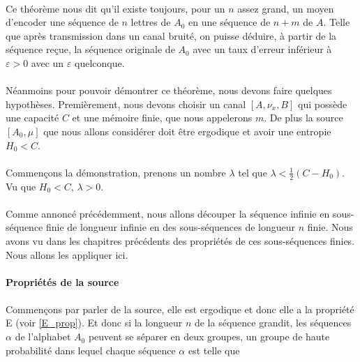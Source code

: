 	\paragraph{}
	Ce théorème nous dit qu'il existe toujours, pour un $n$ assez grand, un moyen d'encoder une séquence de $n$ lettres
	de $A_0$ en une séquence de $n+m$ de $A$. Telle que après transmission dans un canal bruité, on puisse déduire, 
	à partir de la séquence reçue, la séquence originale de $A_0$ avec un taux d'erreur inférieur à $\varepsilon >0$ avec un $\varepsilon$
	quelconque.
	
	\paragraph{}
	Néanmoins pour pouvoir démontrer ce théorème, nous devons faire quelques hypothèses. Premièrement, nous devons choisir un
	canal $[A,\nu_x,B]$ qui possède une capacité $C$ et une mémoire finie, que nous appelerons $m$.
	De plus la source $[A_0,\mu]$ que nous allons considérer doit être ergodique et avoir une entropie $H_0 < C$.


	\paragraph{}
	Commençons la démonstration, prenons un nombre $\lambda$ tel que $\lambda<\frac{1}{2}(C-H_0)$. Vu que $H_0 < C$, $\lambda>0$. 
	
	\paragraph{}
	Comme annoncé précédemment, nous allons découper la séquence infinie en sous-séquence finie de longueur infinie en des sous-séquences 
	de longueur $n$ finie. Nous avons vu dans les chapitres précédents des propriétés de ces sous-séquences finies. Nous allons les appliquer ici.

\paragraph{Propriétés de la source}
	
	\paragraph{}
	Commençons par parler de la source, elle est ergodique et donc elle a la propriété E (voir \ref{E_prop}). 
	Et donc si la longueur $n$ de la séquence grandit, les séquences $\alpha$ de l'alphabet	$A_0$ peuvent se 
	séparer en deux groupes, un groupe de haute probabilité dans lequel chaque séquence $\alpha$ est telle que
	
